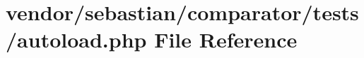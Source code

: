 \section{vendor/sebastian/comparator/tests/autoload.php File Reference}
\label{vendor_2sebastian_2comparator_2tests_2autoload_8php}
